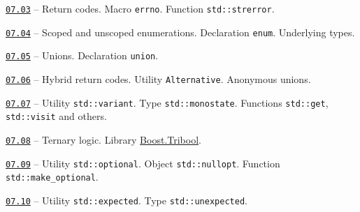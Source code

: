 \documentclass[a4paper,12pt]{article}
\renewenvironment{itemize}
{
    \begin{list}{\labelitemi}
    {
      \setlength{\topsep}{0pt}
      \setlength{\partopsep}{0pt}
      \setlength{\parskip}{0pt}
      \setlength{\itemsep}{0pt}
      \setlength{\parsep}{0pt}
      \setlength{\leftmargin}{14.5pt}
    }
}{\end{list}}
\begin{document}
\begin{itemize}

    \item \href{https://github.com/i-s-m-mipt/Education/blob/master/projects/examples/source/07.03.cpp}{\texttt{07.03}} -- Return codes. Macro \lstinline{errno}. Function \lstinline{std::strerror}.

    \smallskip

    \item \href{https://github.com/i-s-m-mipt/Education/blob/master/projects/examples/source/07.04.cpp}{\texttt{07.04}} -- Scoped and unscoped enumerations. Declaration \lstinline{enum}. Underlying types.

    \smallskip

    \item \href{https://github.com/i-s-m-mipt/Education/blob/master/projects/examples/source/07.05.cpp}{\texttt{07.05}} -- Unions. Declaration \lstinline{union}.

    \smallskip

    \item \href{https://github.com/i-s-m-mipt/Education/blob/master/projects/examples/source/07.06.cpp}{\texttt{07.06}} -- Hybrid return codes. Utility \lstinline{Alternative}. Anonymous unions.

    \smallskip

    \item \href{https://github.com/i-s-m-mipt/Education/blob/master/projects/examples/source/07.07.cpp}{\texttt{07.07}} -- Utility \lstinline{std::variant}. Type \lstinline{std::monostate}. Functions \lstinline{std::get}, \lstinline{std::visit} and others.

    \smallskip

    \item \href{https://github.com/i-s-m-mipt/Education/blob/master/projects/examples/source/07.08.cpp}{\texttt{07.08}} -- Ternary logic. Library \href{https://www.boost.org/doc/libs/1_85_0/doc/html/tribool.html}{Boost.Tribool}.

    \smallskip

    \item \href{https://github.com/i-s-m-mipt/Education/blob/master/projects/examples/source/07.09.cpp}{\texttt{07.09}} -- Utility \lstinline{std::optional}. Object \lstinline{std::nullopt}. Function \lstinline{std::make_optional}.

    \smallskip

    \item \href{https://github.com/i-s-m-mipt/Education/blob/master/projects/examples/source/07.10.cpp}{\texttt{07.10}} -- Utility \lstinline{std::expected}. Type \lstinline{std::unexpected}.

\end{itemize}
\end{document}
